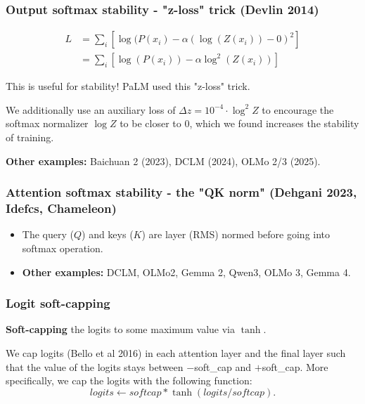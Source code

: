 \documentclass[12pt,twoside]{article}
\begin{document}
\subsubsection*{Output softmax stability - "z-loss" trick (Devlin 2014)}

\begin{align*}
    L &= \sum_{i}[\log(P(x_i) - \alpha(\log(Z(x_i)) - 0)^2] \\
    &= \sum_{i}[\log(P(x_i)) - \alpha\log^2(Z(x_i))]
\end{align*}

This is useful for stability! PaLM used this "z-loss" trick.

\begin{center}
    We additionally use an auxiliary loss of \(\Delta z = 10^{-4} \cdot \log^2 Z\) to encourage the softmax normalizer \(\log Z\) to be closer to 0, which we found increases the stability of training.
\end{center}

\textbf{Other examples:} Baichuan 2 (2023), DCLM (2024), OLMo 2/3 (2025).

\subsubsection*{Attention softmax stability - the "QK norm" (Dehgani 2023, Idefcs, Chameleon)}

\begin{itemize}
    \item The query (\(Q\)) and keys (\(K\)) are layer (RMS) normed before going into softmax operation.
    \item \textbf{Other examples:} DCLM, OLMo2, Gemma 2, Qwen3, OLMo 3, Gemma 4.
\end{itemize}

\subsubsection*{Logit soft-capping}

\textbf{Soft-capping} the logits to some maximum value via \(\tanh\). 

\begin{center}
    We cap logits (Bello et al 2016) in each attention layer and the final layer such that the value of the logits stays between \(-\)soft\_cap and \(+\)soft\_cap. More specifically, we cap the logits with the following function:
    \[
        logits \leftarrow softcap * \tanh(logits / softcap).
    \]
\end{center}
\end{document}
